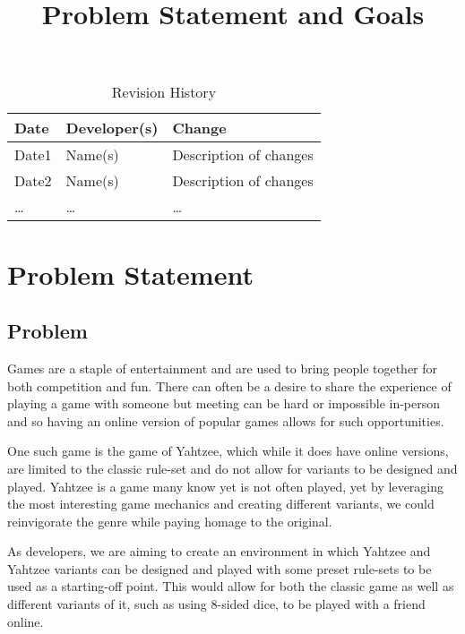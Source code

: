 \documentclass{article}
\title{Problem Statement and Goals\\\progname}
\author{\authname}
\date{}
\begin{document}
\maketitle

\begin{table}[hp]
\caption{Revision History} \label{TblRevisionHistory}
\begin{tabularx}{\textwidth}{llX}
\toprule
\textbf{Date} & \textbf{Developer(s)} & \textbf{Change}\\
\midrule
Date1 & Name(s) & Description of changes\\
Date2 & Name(s) & Description of changes\\
\dots & \dots & \dots\\
\bottomrule
\end{tabularx}
\end{table}

\newpage
\section{Problem Statement}


\subsection{Problem}

Games are a staple of entertainment and are used to bring people together for both competition and fun.
There can often be a desire to share the experience of playing a game with someone but meeting can be hard or impossible in-person and so having an online version of popular games allows for such opportunities.

One such game is the game of Yahtzee, which while it does have online versions, are limited to the classic rule-set and do not allow for variants to be designed and played.
Yahtzee is a game many know yet is not often played, yet by leveraging the most interesting game mechanics and creating different variants, we could reinvigorate the genre while paying homage to the original.

As developers, we are aiming to create an environment in which Yahtzee and Yahtzee variants can be designed and played with some preset rule-sets to be used as a starting-off point. This would allow for both the classic game as well as different variants of it, such as using 8-sided dice, to be played with a friend online.
\end{document}
